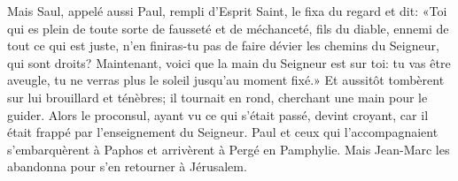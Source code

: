 Mais Saul, appelé aussi Paul, rempli d’Esprit Saint, le fixa du regard et dit:
	«Toi qui es plein de toute sorte de fausseté et de méchanceté,
	fils du diable, ennemi de tout ce qui est juste,
	n’en finiras-tu pas de faire dévier les chemins du Seigneur,
		qui sont droits?
Maintenant, voici que la main du Seigneur est sur toi:
	tu vas être aveugle, tu ne verras plus le soleil jusqu’au moment fixé.»
Et aussitôt tombèrent sur lui brouillard et ténèbres;
	il tournait en rond, cherchant une main pour le guider.
Alors le proconsul, ayant vu ce qui s’était passé,
	devint croyant, car il était frappé par l’enseignement du Seigneur.
Paul et ceux qui l’accompagnaient s’embarquèrent à Paphos
	et arrivèrent à Pergé en Pamphylie.
	Mais Jean-Marc les abandonna pour s’en retourner à Jérusalem.

